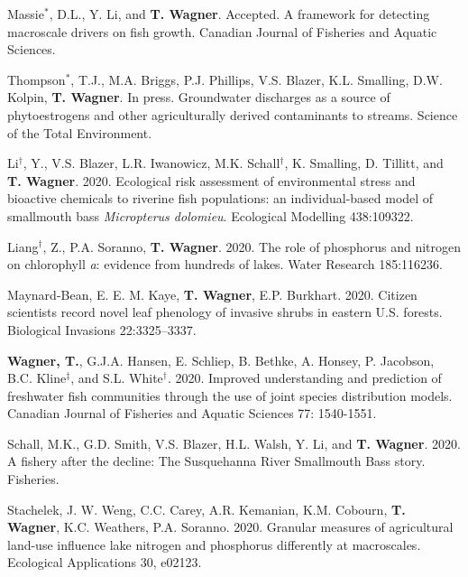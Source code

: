 \documentclass[10pt]{article}
\begin{document}
\begin{flushleft}
\begin{etaremune}[start=105]
\item Massie$^*$, D.L.,  Y. Li, and \textbf{T. Wagner}. Accepted. A framework for detecting macroscale drivers on fish growth.  Canadian Journal of Fisheries and Aquatic Sciences. 

\item Thompson$^*$, T.J., M.A. Briggs, P.J. Phillips, V.S. Blazer, K.L. Smalling, D.W. Kolpin, \textbf{T. Wagner}. In press. Groundwater discharges as a source of phytoestrogens and other agriculturally derived contaminants to streams. Science of the Total Environment.

\item Li$^\dagger$, Y., V.S. Blazer, L.R. Iwanowicz, M.K. Schall$^\dagger$, K. Smalling, D. Tillitt, and \textbf{T. Wagner}. 2020. Ecological risk assessment of environmental stress and bioactive chemicals to riverine fish populations: an individual-based model of smallmouth bass \textit{Micropterus dolomieu}. Ecological Modelling 438:109322.

\item Liang$^\dagger$, Z., P.A. Soranno, \textbf{T. Wagner}. 2020. The role of phosphorus and nitrogen on chlorophyll \textit{a}: evidence from hundreds of lakes. Water Research 185:116236.

\item Maynard-Bean, E. E. M. Kaye, \textbf{T. Wagner}, E.P. Burkhart. 2020. Citizen scientists record novel leaf phenology of invasive shrubs in eastern U.S. forests. Biological Invasions 22:3325–3337.	

\item \textbf{Wagner, T.}, G.J.A. Hansen, E. Schliep, B. Bethke, A. Honsey, P. Jacobson, B.C. Kline$^\ddagger$, and S.L. White$^\dagger$. 2020. Improved understanding and prediction of freshwater fish communities through the use of joint species distribution models. Canadian Journal of Fisheries and Aquatic Sciences 77: 1540-1551.

\item Schall, M.K., G.D. Smith, V.S. Blazer, H.L. Walsh, Y. Li, and \textbf{T. Wagner}.  2020.  A fishery after the decline: The Susquehanna River Smallmouth Bass story.  Fisheries.	
	
\item Stachelek, J. W. Weng, C.C. Carey, A.R. Kemanian, K.M. Cobourn, \textbf{T. Wagner}, K.C. Weathers, P.A. Soranno. 2020. Granular measures of agricultural land-use influence lake nitrogen and phosphorus differently at macroscales. Ecological Applications 30, e02123.


\end{etaremune}
\end{flushleft}
\end{document}
